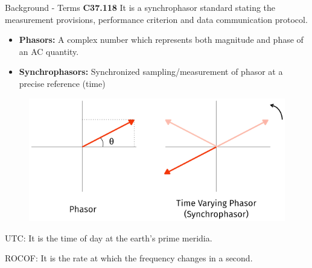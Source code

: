 \documentclass{beamer}
\begin{document}
 
 
     \begin{frame}{Background - Terms}
   	 \textbf{C37.118} It is a synchrophasor standard stating the measurement provisions, performance criterion and data communication protocol.
   	 \begin{center}
		\begin{itemize}
		\item \textbf{Phasors:} A complex number which represents both magnitude and phase of an AC quantity.
		\item \textbf{Synchrophasors:} Synchronized sampling/measurement of phasor at a precise reference (time)
		\end{itemize}
		\begin{figure}
		\includegraphics*[scale=0.5]{Phasors.png}
		\end{figure}
		\item UTC: It is the time of day at the earth's prime meridia.
		\item ROCOF: It is the rate at which the frequency changes in a second.
		
   	 \end{center}
     \end{frame}
 
\end{document}
